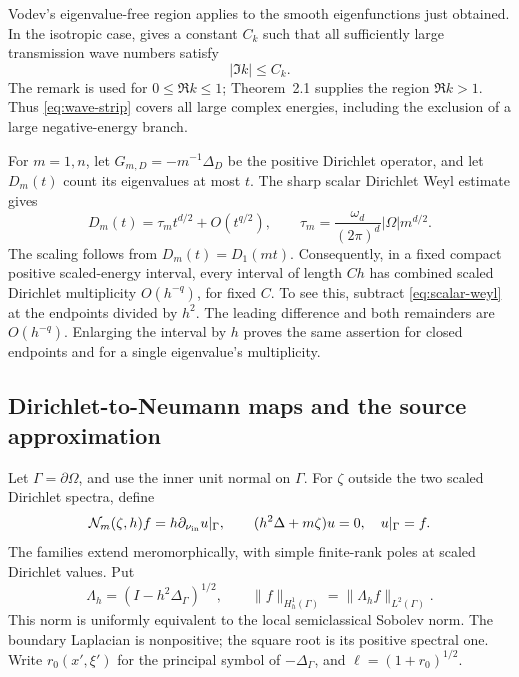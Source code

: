 \documentclass[11pt,a4paper]{article}
\theoremstyle{remark}
\numberwithin{equation}{section}
\begin{document}
Vodev's eigenvalue-free region applies to the smooth eigenfunctions just
obtained. In the isotropic case, \cite[Theorem~2.1 and the following
remark]{Vdn} gives a constant $C_k$ such that all sufficiently large
transmission wave numbers satisfy
\begin{equation}\label{eq:wave-strip}
 |\Im k|\le C_k.
\end{equation}
The remark is used for $0\le\Re k\le1$; Theorem~2.1 supplies the region
$\Re k>1$. Thus \eqref{eq:wave-strip} covers all large complex energies,
including the exclusion of a large negative-energy branch.

For $m=1,n$, let $G_{m,D}=-m^{-1}\Delta_D$ be the positive Dirichlet
operator, and let $D_m(t)$ count its eigenvalues at most $t$.
The sharp scalar Dirichlet Weyl estimate \cite[(0.1)]{PTL} gives
\begin{equation}\label{eq:scalar-weyl}
 D_m(t)=\tau_m t^{d/2}+O(t^{q/2}),\qquad
 \tau_m=\frac{\omega_d}{(2\pi)^d}|\Omega|m^{d/2}.
\end{equation}
The scaling follows from $D_m(t)=D_1(mt)$. Consequently, in a fixed
compact positive scaled-energy interval, every interval of length $Ch$
has combined scaled Dirichlet multiplicity $O(h^{-q})$, for fixed $C$.
To see this, subtract \eqref{eq:scalar-weyl} at the endpoints divided by
$h^2$. The leading difference and both remainders are $O(h^{-q})$.
Enlarging the interval by $h$ proves the same assertion for closed
endpoints and for a single eigenvalue's multiplicity.

\subsection{Dirichlet-to-Neumann maps and the source approximation}
Let $\Gamma=\partial\Omega$, and use the inner unit normal on $\Gamma$.
For $\zeta$ outside the two scaled Dirichlet spectra, define
\begin{equation}\label{eq:DN}
 \mathcal N_m(\zeta,h)f=h\partial_{\nu_{\rm in}}u|_\Gamma,
 \qquad (h^2\Delta+m\zeta)u=0,\quad u|_\Gamma=f.
\end{equation}
The families extend meromorphically, with simple finite-rank poles at
scaled Dirichlet values. Put
\begin{equation}\label{eq:Lambda}
 \Lambda_h=(I-h^2\Delta_\Gamma)^{1/2},\qquad
 \|f\|_{H_h^1(\Gamma)}=\|\Lambda_hf\|_{L^2(\Gamma)}.
\end{equation}
This norm is uniformly equivalent to the local semiclassical Sobolev
norm. The boundary Laplacian is nonpositive; the square root is its
positive spectral one. Write $r_0(x',\xi')$ for the principal symbol of
$-\Delta_\Gamma$, and $\ell=(1+r_0)^{1/2}$.
\end{document}
